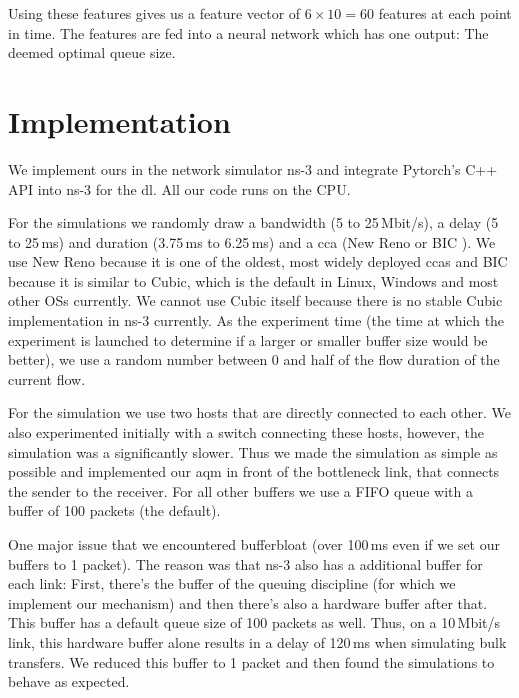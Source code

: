 \documentclass[conference]{IEEEtran}
\begin{document}
Using these features gives us a feature vector of $6\times 10 = 60$ features at each point in time. The features are fed into a neural network which has one output: The deemed optimal queue size.  

\section{Implementation} 

We implement \gls{ours} in the network simulator ns-3 \cite{nsnam_ns-3_nodate} and integrate Pytorch's \cite{paszke_pytorch_2019} C++ API into ns-3 for the \gls{dl}. All our code runs on the CPU. 

For the simulations we randomly draw a bandwidth (5 to 25\,Mbit/s), a delay (5 to 25\,ms) and duration (3.75\,ms to 6.25\,ms) and a \gls{cca} (New Reno or BIC \cite{lisong_xu_binary_2004}). We use New Reno because it is one of the oldest, most widely deployed \glspl{cca} and BIC because it is similar to Cubic, which is the default in Linux, Windows and most other OSs currently. We cannot use Cubic itself because there is no stable Cubic implementation in ns-3 currently. As the experiment time (the time at which the experiment is launched to determine if a larger or smaller buffer size would be better), we use a random number between 0 and half of the flow duration of the current flow. 

For the simulation we use two hosts that are directly connected to each other. We also experimented initially with a switch connecting these hosts, however, the simulation was a significantly slower. Thus we made the simulation as simple as possible and implemented our \gls{aqm} in front of the bottleneck link, that connects the sender to the receiver. For all other buffers we use a FIFO queue with a buffer of 100 packets (the default). 

One major issue that we encountered bufferbloat (over 100\,ms even if we set our buffers to 1 packet). The reason was that ns-3 also has a additional buffer for each link: First, there's the buffer of the queuing discipline (for which we implement our mechanism) and then there's also a hardware buffer after that. This buffer has a default queue size of 100 packets as well. Thus, on a 10\,Mbit/s link, this hardware buffer alone results in a delay of 120\,ms when simulating bulk transfers. We reduced this buffer to 1 packet and then found the simulations to behave as expected. 
\end{document}
